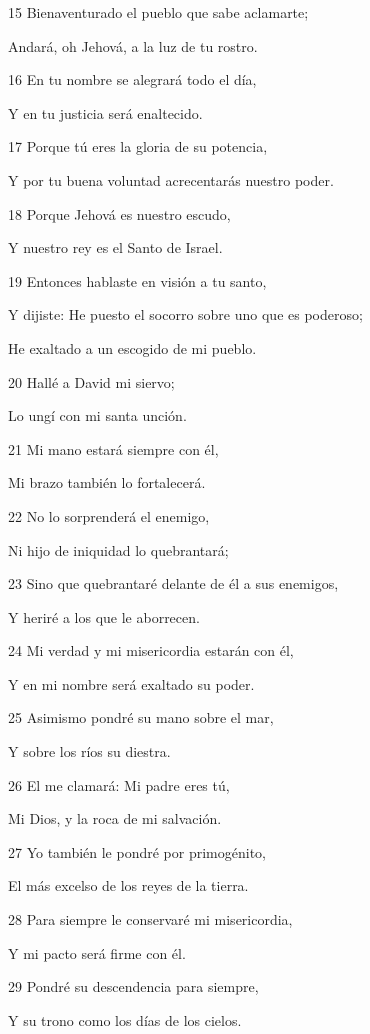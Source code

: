 \par 15 Bienaventurado el pueblo que sabe aclamarte;
\par Andará, oh Jehová, a la luz de tu rostro.
\par 16 En tu nombre se alegrará todo el día,
\par Y en tu justicia será enaltecido.
\par 17 Porque tú eres la gloria de su potencia,
\par Y por tu buena voluntad acrecentarás nuestro poder.
\par 18 Porque Jehová es nuestro escudo,
\par Y nuestro rey es el Santo de Israel.
\par 19 Entonces hablaste en visión a tu santo,
\par Y dijiste: He puesto el socorro sobre uno que es poderoso;
\par He exaltado a un escogido de mi pueblo.
\par 20 Hallé a David mi siervo;
\par Lo ungí con mi santa unción.
\par 21 Mi mano estará siempre con él,
\par Mi brazo también lo fortalecerá.
\par 22 No lo sorprenderá el enemigo,
\par Ni hijo de iniquidad lo quebrantará;
\par 23 Sino que quebrantaré delante de él a sus enemigos,
\par Y heriré a los que le aborrecen.
\par 24 Mi verdad y mi misericordia estarán con él,
\par Y en mi nombre será exaltado su poder.
\par 25 Asimismo pondré su mano sobre el mar,
\par Y sobre los ríos su diestra.
\par 26 El me clamará: Mi padre eres tú,
\par Mi Dios, y la roca de mi salvación.
\par 27 Yo también le pondré por primogénito,
\par El más excelso de los reyes de la tierra.
\par 28 Para siempre le conservaré mi misericordia,
\par Y mi pacto será firme con él.
\par 29 Pondré su descendencia para siempre,
\par Y su trono como los días de los cielos.
